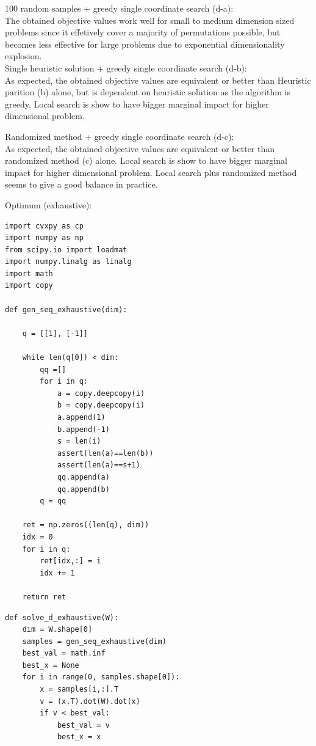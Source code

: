 \documentclass[12pt,letter]{article}
\begin{document}
\begin{enumerate}
\begin{enumerate}
    100 random samples + greedy single coordinate search (d-a):\\
    The obtained objective values work well for small to medium dimension sized problems since it effetively cover a majority of permutations possible, but becomes less effective for large problems due to exponential dimensionality explosion.\\
    
    Single heuristic solution + greedy single coordinate search (d-b):\\
    As expected, the obtained objective values are equivalent or better than Heuristic parition (b) alone, but is dependent on heuristic solution as the algorithm is greedy. Local search is show to have bigger marginal impact for higher dimensional problem.

    Randomized method + greedy single coordinate search (d-c):\\
    As expected, the obtained objective values are equivalent or better than randomized method (c) alone. Local search is show to have bigger marginal impact for higher dimensional problem. Local search plus randomized method seems to give a good balance in practice.
    
    \pagebreak

    Optimum (exhaustive):
\begin{Verbatim}[fontsize=\small]
import cvxpy as cp
import numpy as np
from scipy.io import loadmat
import numpy.linalg as linalg
import math
import copy

def gen_seq_exhaustive(dim):
    
    q = [[1], [-1]]

    while len(q[0]) < dim:
        qq =[]
        for i in q:
            a = copy.deepcopy(i)
            b = copy.deepcopy(i)
            a.append(1)
            b.append(-1)
            s = len(i)
            assert(len(a)==len(b))
            assert(len(a)==s+1)
            qq.append(a)
            qq.append(b)
        q = qq

    ret = np.zeros((len(q), dim))
    idx = 0
    for i in q:
        ret[idx,:] = i
        idx += 1

    return ret
\end{Verbatim}
    \pagebreak
\begin{Verbatim}[fontsize=\small]
def solve_d_exhaustive(W):
    dim = W.shape[0]
    samples = gen_seq_exhaustive(dim)
    best_val = math.inf
    best_x = None
    for i in range(0, samples.shape[0]):
        x = samples[i,:].T
        v = (x.T).dot(W).dot(x)
        if v < best_val:
            best_val = v
            best_x = x
            

\end{Verbatim}
\end{enumerate}
\end{enumerate}
\end{document}
